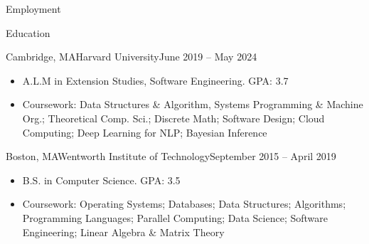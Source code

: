 \documentclass[]{mcdowellcv}
\begin{document}
\begin{cvsection}{Employment}
		
		
	\end{cvsection}
	
	\begin{cvsection}{Education}
		\begin{cvsubsection}{Cambridge, MA}{Harvard University}{June 2019 -- May 2024}
		
			\begin{itemize}
				\item A.L.M in Extension Studies, Software Engineering. GPA: 3.7
				\item Coursework: Data Structures \& Algorithm, Systems Programming \& Machine Org.; Theoretical Comp. Sci.; Discrete Math; Software Design; Cloud Computing; Deep Learning for NLP; Bayesian Inference
				\end{itemize}
		\end{cvsubsection}
		\begin{cvsubsection}{Boston, MA}{Wentworth Institute of Technology}{September 2015 -- April 2019}
		\vspace{2mm}
			\begin{itemize}
				\item B.S. in Computer Science. GPA: 3.5
				\item Coursework: Operating Systems; Databases; Data Structures; Algorithms; Programming Languages; Parallel Computing; Data Science; Software Engineering; Linear Algebra \& Matrix Theory
			\end{itemize}
		\end{cvsubsection}
	\end{cvsection}
	
\end{document}
